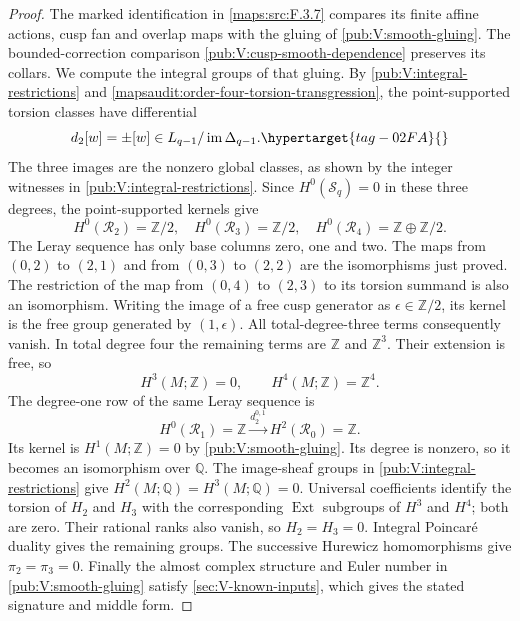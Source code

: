 \documentclass[11pt,a4paper]{article}
\numberwithin{equation}{section}
\theoremstyle{definition}
\begin{document}
\begin{proof}
The marked identification in \cref{maps:src:F.3.7} compares its
finite affine actions, cusp fan and overlap maps with the gluing
of \cref{pub:V:smooth-gluing}. The bounded-correction comparison
\cref{pub:V:cusp-smooth-dependence} preserves its collars.
We compute the integral groups of that gluing.
By \cref{pub:V:integral-restrictions} and
\cref{mapsaudit:order-four-torsion-transgression}, the point-supported
torsion classes have differential
\begin{equation}
 d_2[w]=\pm[w]\in L_{q-1}/\operatorname{im}\Delta_{q-1}.
 \hypertarget{tag-02FA}{}\label{maps:eq:F.6}
\end{equation}
The three images are the nonzero global classes, as shown by the
integer witnesses in \cref{pub:V:integral-restrictions}.
Since $H^0(\mathcal S_q)=0$ in these three degrees, the
point-supported kernels give
\[
 H^0(\mathcal R_2)=\mathbb Z/2,\quad
 H^0(\mathcal R_3)=\mathbb Z/2,\quad
 H^0(\mathcal R_4)=\mathbb Z\oplus\mathbb Z/2.
\]
The Leray sequence
\cite[Tag 01F2, Lemma 20.13.4; chapter PDF p.~22]{StacksProject}
has only base columns zero, one and two.
The maps from $(0,2)$ to $(2,1)$ and from $(0,3)$ to $(2,2)$ are
the isomorphisms just proved.  The restriction of the map from
$(0,4)$ to $(2,3)$ to its torsion summand is also an isomorphism.
Writing the image of a free cusp generator as $\epsilon\in\mathbb Z/2$,
its kernel is the free group generated by $(1,\epsilon)$.
All total-degree-three terms consequently vanish.  In total degree
four the remaining terms are $\mathbb Z$ and $\mathbb Z^3$.
Their extension is free, so
\[
                   H^3(M;\mathbb Z)=0,\qquad
                   H^4(M;\mathbb Z)=\mathbb Z^4.
\]
The degree-one row of the same Leray sequence is
\[
 H^0(\mathcal R_1)=\mathbb Z
 \xrightarrow{d_2^{0,1}}H^2(\mathcal R_0)=\mathbb Z.
\]
Its kernel is $H^1(M;\mathbb Z)=0$ by
\cref{pub:V:smooth-gluing}. Its degree is nonzero, so it becomes
an isomorphism over $\mathbb Q$. The image-sheaf groups in
\cref{pub:V:integral-restrictions} give
$H^2(M;\mathbb Q)=H^3(M;\mathbb Q)=0$.
Universal coefficients
\cite[Theorem~3.2 and Corollary~3.3, pp.~195--196]{Hatcher2002}
identify the torsion of $H_2$ and $H_3$ with the corresponding
$\operatorname{Ext}$ subgroups of $H^3$ and $H^4$; both are zero.
Their rational ranks also vanish, so $H_2=H_3=0$.
Integral Poincar\'e duality
\cite[Theorem~3.30, p.~241]{Hatcher2002} gives the remaining groups.
The successive Hurewicz homomorphisms
\cite[Theorem~4.32, p.~366]{Hatcher2002} give $\pi_2=\pi_3=0$.
Finally the almost complex structure and Euler number in
\cref{pub:V:smooth-gluing} satisfy
\cref{sec:V-known-inputs}, which gives the stated signature and
middle form.
\end{proof}
\end{document}
